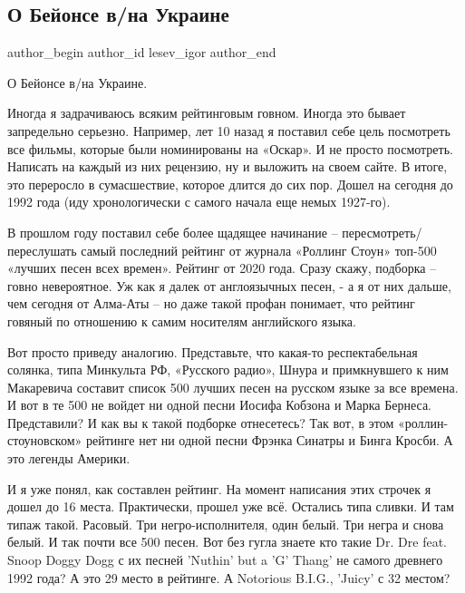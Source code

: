  
 
 
 
 
\subsection{О Бейонсе в/на Украине}
\label{sec:06_01_2022.tg.lesev_igor.1.bejonse}

\ifcmt
 author_begin
   author_id lesev_igor
 author_end
\fi

О Бейонсе в/на Украине.

Иногда я задрачиваюсь всяким рейтинговым говном. Иногда это бывает запредельно
серьезно. Например, лет 10 назад я поставил себе цель посмотреть все фильмы,
которые были номинированы на «Оскар». И не просто посмотреть. Написать на
каждый из них рецензию, ну и выложить на своем сайте. В итоге, это переросло в
сумасшествие, которое длится до сих пор. Дошел на сегодня до 1992 года (иду
хронологически с самого начала еще немых 1927-го).

В прошлом году поставил себе более щадящее начинание – пересмотреть/переслушать
самый последний рейтинг от журнала «Роллинг Стоун» топ-500 «лучших песен всех
времен». Рейтинг от 2020 года. Сразу скажу, подборка – говно невероятное. Уж
как я далек от англоязычных песен, - а я от них дальше, чем сегодня от Алма-Аты
– но даже такой профан понимает, что рейтинг говяный по отношению к самим
носителям английского языка.

Вот просто приведу аналогию. Представьте, что какая-то респектабельная солянка,
типа Минкульта РФ, «Русского радио», Шнура и примкнувшего к ним Макаревича
составит список 500 лучших песен на русском языке за все времена. И вот в те
500 не войдет ни одной песни Иосифа Кобзона и Марка Бернеса. Представили? И как
вы к такой подборке отнесетесь? Так вот, в этом «роллин-стоуновском» рейтинге
нет ни одной песни Фрэнка Синатры и Бинга Кросби. А это легенды Америки.

И я уже понял, как составлен рейтинг. На момент написания этих строчек я дошел
до 16 места. Практически, прошел уже всё. Остались типа сливки. И там типаж
такой. Расовый. Три негро-исполнителя, один белый. Три негра и снова белый. И
так почти все 500 песен. Вот без гугла знаете кто такие Dr. Dre feat. Snoop
Doggy Dogg с их песней 'Nuthin' but a 'G' Thang' не самого древнего 1992 года?
А это 29 место в рейтинге. А Notorious B.I.G., 'Juicy' с 32 местом?

